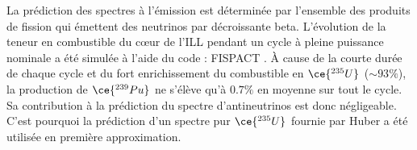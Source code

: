 La prédiction des spectres à l'émission est déterminée par l'ensemble des produits de fission qui émettent des neutrinos par décroissante beta. L'évolution de la teneur en combustible du c\oe ur de l'ILL pendant un cycle à pleine puissance nominale a été simulée à l'aide du code : FISPACT \cite{Sublet:2017mbt}. À cause de la courte durée de chaque cycle et du fort enrichissement du combustible en $\ce{^{235}U}$ ($\sim 93 \%$), la production de $\ce{^{239}Pu}$ ne s'élève qu'à $0.7 \%$ en moyenne sur tout le cycle. Sa contribution à la prédiction du spectre d'antineutrinos est donc négligeable. C'est pourquoi la prédiction d'un spectre pur $\ce{^{235}U}$ fournie par Huber \cite{Huber:2011wv} a été utilisée en première approximation.\\


